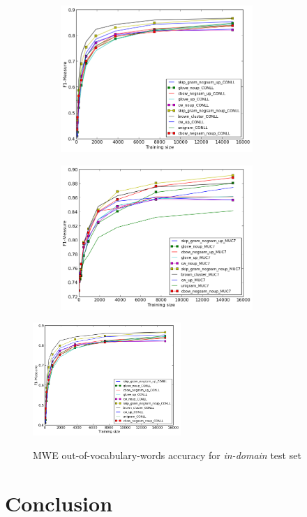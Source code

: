\begin{figure}
\caption{NER out-of-vocabulary-words accuracy for \textit{in-domain} and \textit{out-of-domain} test sets}
\centering
\begin{subfigure}{.5\textwidth}
	\centering
    	\includegraphics[width=0.8\textwidth]{plots/NERoutOfVocIN.png}
	\label{fig:inner}
\end{subfigure}
\begin{subfigure}{.5\textwidth}
	\centering
    	\includegraphics[width=0.8\textwidth]{plots/NERoutOfVocOUT.png}
	\label{fig:outner}
\end{subfigure}  	
\end{figure}


\begin{figure}
\caption{MWE out-of-vocabulary-words accuracy for \textit{in-domain} test set}
\centering
    	\includegraphics[width=0.5\textwidth]{plots/NERoutOfVocIN.png}    
\label{fig:outmwe}
\end{figure}





\section{Conclusion}
